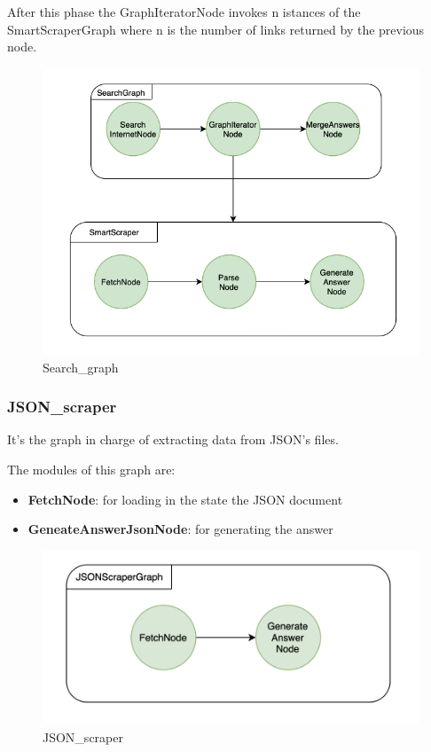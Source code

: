 After this phase the GraphIteratorNode invokes n istances of the SmartScraperGraph where n is the number of links returned by the previous node.
\begin{figure}[H]
    \centering
    \includegraphics[width=1\linewidth]{Assets/search_graph.png}
    \caption{Search\_graph}
    \label{fig:enter-label}
\end{figure}
\subsubsection{JSON\_scraper}
It's the graph in charge of extracting data from JSON's files.

The modules of this graph are: 
\begin{itemize}
    \item \textbf{FetchNode}: for loading in the state the JSON document 
    \item \textbf{GeneateAnswerJsonNode}: for generating the answer 
\end{itemize}

\begin{figure}[H]
    \centering
    \includegraphics[width=0.75\linewidth]{Assets/json_scraper.png}
    \caption{JSON\_scraper}
    \label{fig:json_scraper}
\end{figure}
